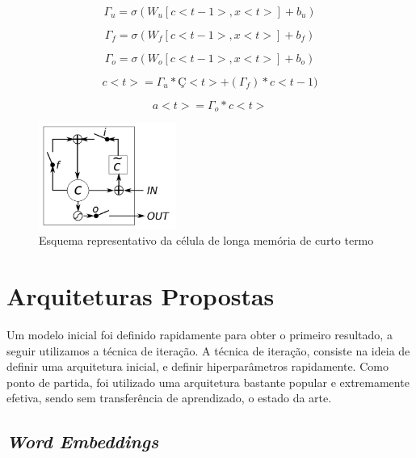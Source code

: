 \documentclass[12pt]{article}
\begin{document}
\begin{equation}
    \Gamma_u = \sigma(W_u[c<t-1>, x<t>]+b_u)
\end{equation}

\begin{equation}
    \Gamma_f = \sigma(W_f[c<t-1>, x<t>]+b_f)
\end{equation}

\begin{equation}
    \Gamma_o = \sigma(W_o[c<t-1>, x<t>]+b_o)
\end{equation}

\begin{equation}
    c<t>=\Gamma_u*Ç<t>+(\Gamma_f)*c<t-1)
\end{equation}

\begin{equation}
    a<t>=\Gamma_o*c<t>
\end{equation}

\begin{figure}[!htb]
\centering
\includegraphics[width=0.4\textwidth]{images/lstm_gate.png}
\caption{Esquema representativo da célula de longa memória de curto termo \cite{DBLP:journals/corr/ChungGCB14}}
\label{fig:lstm_date}
\end{figure}

\section{Arquiteturas Propostas}

Um modelo inicial foi definido rapidamente para obter o primeiro resultado, a seguir utilizamos a técnica de iteração. A técnica de iteração, consiste na ideia de definir uma arquitetura inicial, e definir hiperparâmetros rapidamente. Como ponto de partida, foi utilizado uma arquitetura bastante popular e extremamente efetiva, sendo sem transferência de aprendizado, o estado da arte.

\subsection{\textit{Word Embeddings}}
\end{document}
